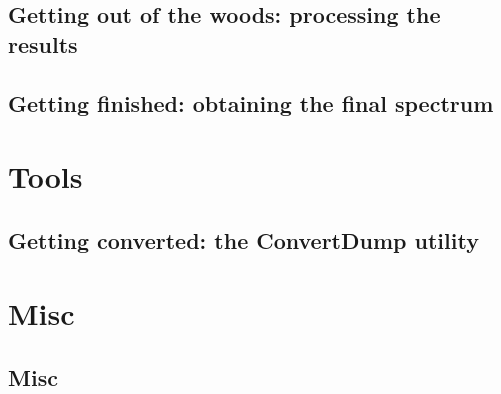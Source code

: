 \documentclass[a4paper,fleqn]{report}
\begin{document}
	\chapter{Getting out of the woods: processing the results}
	
	\chapter{Getting finished: obtaining the final spectrum}
	
	\part{Tools}
	\chapter{Getting converted: the ConvertDump utility}
	
	\part{Misc}
	\chapter{Misc}
	
\end{document}

